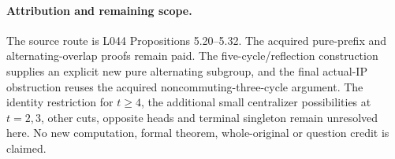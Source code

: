 \documentclass[11pt,a4paper]{article}
\begin{document}
\paragraph{Attribution and remaining scope.}
The source route is L044 Propositions 5.20--5.32. The acquired
pure-prefix and alternating-overlap proofs remain paid. The
five-cycle/reflection construction supplies an explicit new
pure alternating subgroup, and the final actual-IP obstruction
reuses the acquired noncommuting-three-cycle argument.
The identity restriction for $t\ge4$, the additional small
centralizer possibilities at $t=2,3$, other cuts, opposite heads
and terminal singleton remain unresolved here. No new computation,
formal theorem, whole-original or question credit is claimed.
\end{document}
